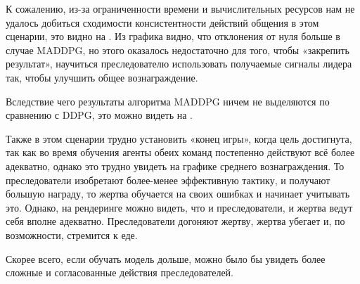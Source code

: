 К сожалению, из-за ограниченности времени и вычислительных ресурсов нам не удалось добиться сходимости консистентности действий общения в этом сценарии, это видно на . Из графика видно, что отклонения от нуля больше в случае MADDPG, но этого оказалось недостаточно для того, чтобы «закрепить результат», научиться преследователю использовать получаемые сигналы лидера так, чтобы улучшить общее вознаграждение.

Вследствие чего результаты алгоритма MADDPG ничем не выделяются по сравнению с DDPG, это можно видеть на .

Также в этом сценарии трудно установить «конец игры», когда цель достигнута, так как во время обучения агенты обеих команд постепенно действуют всё более адекватно, однако это трудно увидеть на графике среднего вознаграждения. То преследователи изобретают более-менее эффективную тактику, и получают большую награду, то жертва обучается на своих ошибках и начинает учитывать это. Однако, на рендеринге можно видеть, что и преследователи, и жертва ведут себя вполне адекватно. Преследователи догоняют жертву, жертва убегает и, по возможности, стремится к еде.

Скорее всего, если обучать модель дольше, можно было бы увидеть более сложные и согласованные действия преследователей.
